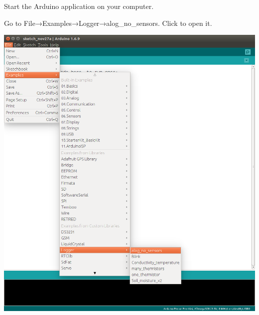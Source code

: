 \begin{DoxyEnumerate}
\item Start the Arduino application on your computer.
\item Go to File→\+Examples→\+Logger→alog\+\_\+no\+\_\+sensors. Click to open it.  
\begin{DoxyImage}
\includegraphics[width=.8\linewidth]{Open_alog_no_sensors.png}
\end{DoxyImage}


\end{DoxyEnumerate}
